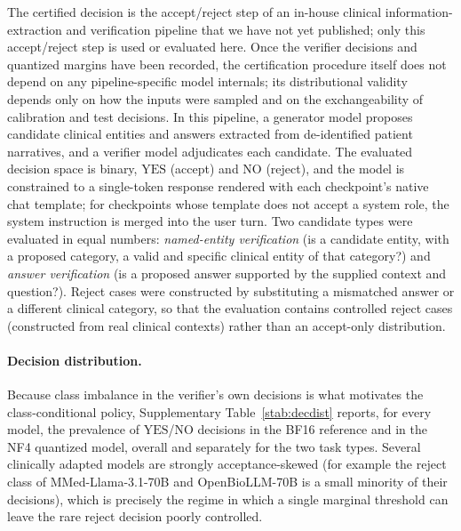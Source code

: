 \documentclass[11pt]{article}
\theoremstyle{plain}
\newcommand{\YES}{\mathrm{YES}}
\newcommand{\NO}{\mathrm{NO}}
\begin{document}
The certified decision is the accept/reject step of an in-house clinical information-extraction
and verification pipeline that we have not yet published; only this accept/reject step is used or
evaluated here. Once the verifier decisions and quantized margins have been recorded, the certification
procedure itself does not depend on any pipeline-specific model internals; its distributional validity
depends only on how the inputs were sampled and on the exchangeability of calibration and test
decisions. In this pipeline, a generator model proposes candidate clinical entities and answers extracted from
de-identified patient narratives, and a verifier model adjudicates each candidate. The evaluated
decision space is binary, $\YES$ (accept) and $\NO$ (reject), and the model is constrained to a
single-token response rendered with each checkpoint's native chat template; for checkpoints whose
template does not accept a system role, the system instruction is merged into the user turn. Two
candidate types were evaluated in equal numbers: \emph{named-entity verification} (is a candidate
entity, with a proposed category, a valid and specific clinical entity of that category?) and
\emph{answer verification} (is a proposed answer supported by the supplied context and question?).
Reject cases were constructed by substituting a mismatched answer or a different clinical category, so
that the evaluation contains controlled reject cases (constructed from real clinical contexts) rather
than an accept-only distribution.

\paragraph{Decision distribution.} Because class imbalance in the verifier's own decisions is what
motivates the class-conditional policy, Supplementary Table~\ref{stab:decdist} reports, for every
model, the prevalence of $\YES$/$\NO$ decisions in the BF16 reference and in the NF4 quantized model,
overall and separately for the two task types. Several clinically adapted models are strongly
acceptance-skewed (for example the reject class of MMed-Llama-3.1-70B and OpenBioLLM-70B is a small
minority of their decisions), which is precisely the regime in which a single marginal threshold can
leave the rare reject decision poorly controlled.
\end{document}
